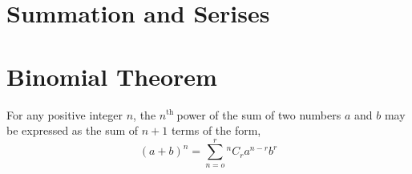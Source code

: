 \section{Summation and Serises}
\begin{minipage}{0.45\textwidth}
	\begin{center}
	\end{center}
\end{minipage}
\begin{minipage}{0.45\textwidth}
	\begin{center}
	\end{center}
\end{minipage}
\section{Binomial Theorem}
\begin{theorem}
	For any positive integer $ n $, the $ n ^{\text{th }}$power of the sum of two numbers $ a $ and $ b $ may be expressed as the sum of $ n + 1 $ terms of the form,
\begin{equation}
		(a+b)^{n}= \sum_{n=o}^{r} {^{n}C_{r} a^{n-r}b^{r}}
\end{equation}

\end{theorem}
